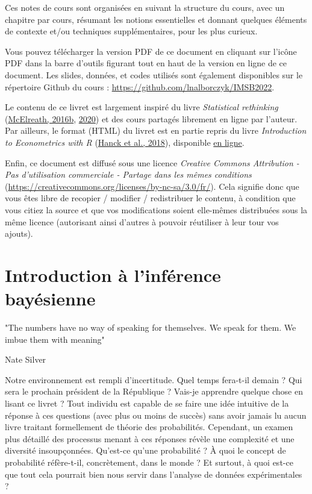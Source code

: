 \documentclass[
  a4paper,11pt,twoside,onecolumn,openright,final,oldfontcommands]{memoir}
\theoremstyle{definition}
\theoremstyle{definition}
\theoremstyle{definition}
\theoremstyle{definition}
\theoremstyle{remark}
\begin{document}
Ces notes de cours sont organisées en suivant la structure du cours, avec un chapitre par cours, résumant les notions essentielles et donnant quelques éléments de contexte et/ou techniques supplémentaires, pour les plus curieux.

Vous pouvez télécharger la version PDF de ce document en cliquant sur l'icône PDF dans la barre d'outils figurant tout en haut de la version en ligne de ce document. Les slides, données, et codes utilisés sont également disponibles sur le répertoire Github du cours : \url{https://github.com/lnalborczyk/IMSB2022}.

Le contenu de ce livret est largement inspiré du livre \emph{Statistical rethinking} (\protect\hyperlink{ref-mcelreath_statistical_2016}{McElreath, 2016b}, \protect\hyperlink{ref-mcelreath_statistical_2020}{2020}) et des cours partagés librement en ligne par l'auteur. Par ailleurs, le format (HTML) du livret est en partie repris du livre \emph{Introduction to Econometrics with R} (\protect\hyperlink{ref-hanck_introduction_2018}{Hanck et al., 2018}), disponible \href{https://bookdown.org/machar1991/ITER/}{en ligne}.

Enfin, ce document est diffusé sous une licence \emph{Creative Commons Attribution - Pas d'utilisation commerciale - Partage dans les mêmes conditions} (\url{https://creativecommons.org/licenses/by-nc-sa/3.0/fr/}). Cela signifie donc que vous êtes libre de recopier / modifier / redistribuer le contenu, à condition que vous citiez la source et que vos modifications soient elle-mêmes distribuées sous la même licence (autorisant ainsi d'autres à pouvoir réutiliser à leur tour vos ajouts).

\hypertarget{introduction}{%
\chapter{Introduction à l'inférence bayésienne}\label{introduction}}


\epigraph{"The numbers have no way of speaking for themselves. We speak for them. We imbue them with meaning"}{Nate Silver}

Notre environnement est rempli d'incertitude. Quel temps fera-t-il demain ? Qui sera le prochain président de la République ? Vais-je apprendre quelque chose en lisant ce livret ? Tout individu est capable de se faire une idée intuitive de la réponse à ces questions (avec plus ou moins de succès) sans avoir jamais lu aucun livre traitant formellement de théorie des probabilités. Cependant, un examen plus détaillé des processus menant à ces réponses révèle une complexité et une diversité insoupçonnées. Qu'est-ce qu'une probabilité ? À quoi le concept de probabilité réfère-t-il, concrètement, dans le monde ? Et surtout, à quoi est-ce que tout cela pourrait bien nous servir dans l'analyse de données expérimentales ?
\end{document}
